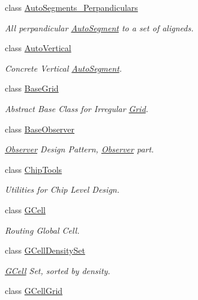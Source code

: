 \begin{DoxyCompactItemize}
class \hyperlink{classKatabatic_1_1AutoSegments__Perpandiculars}{Auto\+Segments\+\_\+\+Perpandiculars}
\begin{DoxyCompactList}\small\item\em All perpandicular \hyperlink{classKatabatic_1_1AutoSegment}{Auto\+Segment} to a set of aligneds. \end{DoxyCompactList}\item 
class \hyperlink{classKatabatic_1_1AutoVertical}{Auto\+Vertical}
\begin{DoxyCompactList}\small\item\em Concrete Vertical \hyperlink{classKatabatic_1_1AutoSegment}{Auto\+Segment}. \end{DoxyCompactList}\item 
class \hyperlink{classKatabatic_1_1BaseGrid}{Base\+Grid}
\begin{DoxyCompactList}\small\item\em Abstract Base Class for Irregular \hyperlink{classKatabatic_1_1Grid}{Grid}. \end{DoxyCompactList}\item 
class \hyperlink{classKatabatic_1_1BaseObserver}{Base\+Observer}
\begin{DoxyCompactList}\small\item\em \hyperlink{classKatabatic_1_1Observer}{Observer} Design Pattern, \hyperlink{classKatabatic_1_1Observer}{Observer} part. \end{DoxyCompactList}\item 
class \hyperlink{classKatabatic_1_1ChipTools}{Chip\+Tools}
\begin{DoxyCompactList}\small\item\em Utilities for Chip Level Design. \end{DoxyCompactList}\item 
class \hyperlink{classKatabatic_1_1GCell}{G\+Cell}
\begin{DoxyCompactList}\small\item\em Routing Global Cell. \end{DoxyCompactList}\item 
class \hyperlink{classKatabatic_1_1GCellDensitySet}{G\+Cell\+Density\+Set}
\begin{DoxyCompactList}\small\item\em \hyperlink{classKatabatic_1_1GCell}{G\+Cell} Set, sorted by density. \end{DoxyCompactList}\item 
class \hyperlink{classKatabatic_1_1GCellGrid}{G\+Cell\+Grid}

\end{DoxyCompactItemize}
